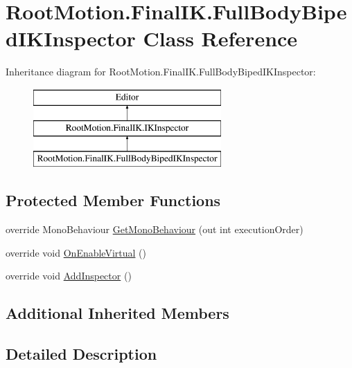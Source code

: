 \hypertarget{class_root_motion_1_1_final_i_k_1_1_full_body_biped_i_k_inspector}{}\section{Root\+Motion.\+Final\+I\+K.\+Full\+Body\+Biped\+I\+K\+Inspector Class Reference}
\label{class_root_motion_1_1_final_i_k_1_1_full_body_biped_i_k_inspector}
Inheritance diagram for Root\+Motion.\+Final\+I\+K.\+Full\+Body\+Biped\+I\+K\+Inspector\+:\begin{figure}[H]
\begin{center}
\leavevmode
\includegraphics[height=3.000000cm]{class_root_motion_1_1_final_i_k_1_1_full_body_biped_i_k_inspector}
\end{center}
\end{figure}
\subsection*{Protected Member Functions}
\begin{DoxyCompactItemize}
\item 
override Mono\+Behaviour \mbox{\hyperlink{class_root_motion_1_1_final_i_k_1_1_full_body_biped_i_k_inspector_a5eb8e15b2fa1f2aeb03c68c79eac9887}{Get\+Mono\+Behaviour}} (out int execution\+Order)
\item 
override void \mbox{\hyperlink{class_root_motion_1_1_final_i_k_1_1_full_body_biped_i_k_inspector_aabfeb6f3917b1ba7fb58725b9ea11a3a}{On\+Enable\+Virtual}} ()
\item 
override void \mbox{\hyperlink{class_root_motion_1_1_final_i_k_1_1_full_body_biped_i_k_inspector_aa14e7b3a4ce0385ef84caa026651c6f8}{Add\+Inspector}} ()
\end{DoxyCompactItemize}
\subsection*{Additional Inherited Members}


\subsection{Detailed Description}


